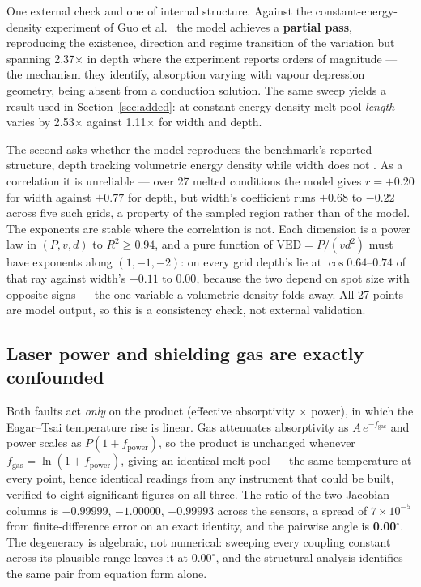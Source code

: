 \documentclass[final,5p,times,twocolumn]{elsarticle}
\begin{document}
One external check and one of internal structure. Against the
constant-energy-density experiment of Guo et al.\ \cite{Guo2019} the model
achieves a \textbf{partial pass}, reproducing the existence, direction and regime
transition of the variation but spanning 2.37$\times$ in depth where the
experiment reports orders of magnitude --- the mechanism they identify,
absorption varying with vapour depression geometry, being absent from a
conduction solution. The same sweep yields a result used in
Section~\ref{sec:added}: at constant energy density melt pool \emph{length}
varies by 2.53$\times$ against 1.11$\times$ for width and depth.

The second asks whether the model reproduces the benchmark's reported structure,
depth tracking volumetric energy density while width does not \cite{Weaver2024}.
As a correlation it is unreliable --- over 27 melted conditions the model gives
$r=+0.20$ for width against $+0.77$ for depth, but width's coefficient runs
$+0.68$ to $-0.22$ across five such grids, a property of the sampled region
rather than of the model. The exponents are stable where the correlation is not.
Each dimension is a power law in $(P,v,d)$ to $R^{2}\ge0.94$, and a pure function
of $\mathrm{VED}=P/(vd^{2})$ must have exponents along $(1,-1,-2)$: on every grid
depth's lie at $\cos 0.64$--$0.74$ of that ray against width's $-0.11$ to
$0.00$, because the two depend on spot size with opposite signs --- the one
variable a volumetric density folds away. All 27 points are model output, so this
is a consistency check, not external validation.

\subsection{Laser power and shielding gas are exactly confounded}
\label{sec:confound}

Both faults act \emph{only} on the product (effective absorptivity $\times$
power), in which the Eagar--Tsai temperature rise is linear. Gas attenuates
absorptivity as $A\,e^{-f_{\mathrm{gas}}}$ and power scales as
$P(1+f_{\mathrm{power}})$, so the product is unchanged whenever
$f_{\mathrm{gas}}=\ln(1+f_{\mathrm{power}})$, giving an identical melt pool ---
the same temperature at every point, hence identical readings from any instrument
that could be built, verified to eight significant figures on all three. The
ratio of the two Jacobian columns is $-0.99999$, $-1.00000$, $-0.99993$ across
the sensors, a spread of $7\times10^{-5}$ from finite-difference error on an
exact identity, and the pairwise angle is \textbf{0.00$^\circ$}. The degeneracy
is algebraic, not numerical: sweeping every coupling constant across its
plausible range leaves it at $0.00^\circ$, and the structural analysis identifies
the same pair from equation form alone.
\end{document}
